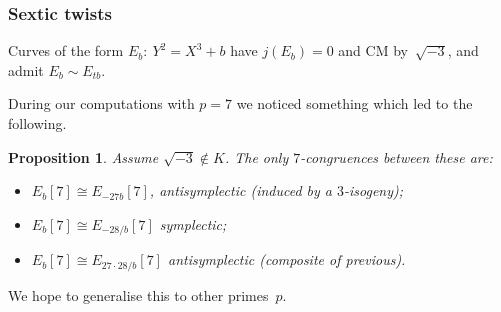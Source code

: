 \documentclass[handout]{beamer}
\newtheorem{prop}{Proposition}
\newcommand{\high}[1]{\emph{\color{blue}{#1}}}
\begin{document}
\begin{frame}\frametitle{Sextic twists}
  Curves of the form $E_b:\ Y^2=X^3+b$ have $j(E_b)=0$ and CM
  by~$\sqrt{-3}$, and admit \high{sextic twists} $E_b\sim E_{tb}$.

  \pause\medskip

  During our computations with $p=7$ we noticed something which led to
  the following.

  \pause\medskip

  \begin{prop}
  Assume $\sqrt{-3}\notin K$.  The only $7$-congruences between these
  are:
  \begin{itemize}
  \item $E_b[7]\cong E_{-27b}[7]$, antisymplectic (induced by a
    $3$-isogeny);
  \item $E_b[7] \cong E_{-28/b}[7]$ symplectic;
  \item $E_b[7] \cong E_{27\cdot28/b}[7]$ antisymplectic (composite of
    previous).
  \end{itemize}
  \end{prop}
  \pause\medskip

  We hope to generalise this to other primes~$p$.
\end{frame}

\end{document}
